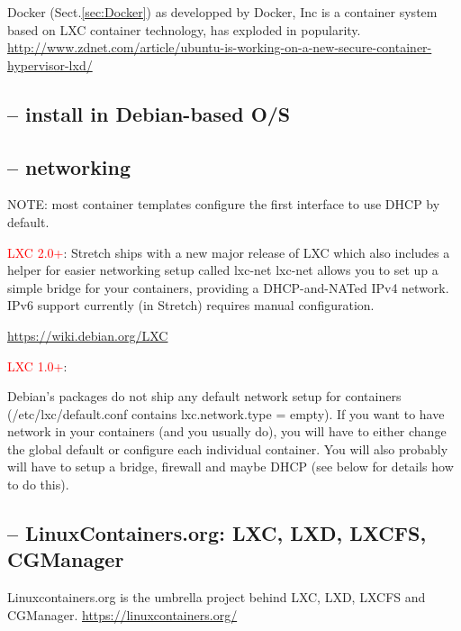 Docker (Sect.\ref{sec:Docker}) as developped by Docker, Inc is a container
system based on LXC container technology, has exploded in popularity.
\url{http://www.zdnet.com/article/ubuntu-is-working-on-a-new-secure-container-hypervisor-lxd/}

\subsection{-- install in Debian-based O/S}


\subsection{-- networking}

NOTE: most container templates configure the first interface to use DHCP by default.

\textcolor{red}{LXC 2.0+}:
Stretch ships with a new major release of LXC which also includes a helper for
easier networking setup called lxc-net lxc-net allows you to set up a simple
bridge for your containers, providing a DHCP-and-NATed IPv4 network. IPv6
support currently (in Stretch) requires manual configuration.

\url{https://wiki.debian.org/LXC}
 
\textcolor{red}{LXC 1.0+}:
 
Debian's packages do not ship any default network setup for containers
(/etc/lxc/default.conf contains lxc.network.type = empty).
If you want to have network in your containers (and you usually do), you will
have to either change the global default or configure each individual container.
You will also probably will have to setup a bridge, firewall and maybe DHCP (see
below for details how to do this).




\subsection{-- LinuxContainers.org: LXC, LXD, LXCFS, CGManager}
\label{sec:linuxcontainers.org}

Linuxcontainers.org is the umbrella project behind LXC, LXD, LXCFS and
CGManager.
\url{https://linuxcontainers.org/}

